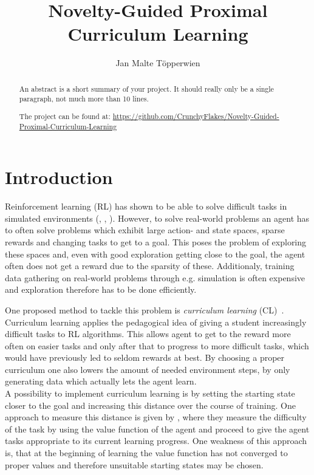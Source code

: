 \documentclass{article}
\title{Novelty-Guided Proximal Curriculum Learning}
\author{Jan Malte Töpperwien}
\begin{document}
\maketitle
\begin{abstract}
    An abstract is a short summary of your project. It should really only be a single paragraph, not much more than 10 lines.

    The project can be found at: \url{https://github.com/CrunchyFlakes/Novelty-Guided-Proximal-Curriculum-Learning}
\end{abstract}
\section{Introduction}
Reinforcement learning (RL) has shown to be able to solve difficult tasks in simulated environments (\citep{human_level_control}, \citep{continuous_control}, \citep{rl_go}). However, to solve real-world problems an agent has to often solve problems which exhibit large action- and state spaces, sparse rewards and changing tasks to get to a goal. This poses the problem of exploring these spaces and, even with good exploration getting close to the goal, the agent often does not get a reward due to the sparsity of these. Additionaly, training data gathering on real-world problems through e.g. simulation is often expensive and exploration therefore has to be done efficiently.

One proposed method to tackle this problem is \textit{curriculum learning} (CL)~\citep{curr}. Curriculum learning applies the pedagogical idea of giving a student increasingly difficult tasks to RL algorithms. This allows agent to get to the reward more often on easier tasks and only after that to progress to more difficult tasks, which would have previously led to seldom rewards at best. By choosing a proper curriculum one also lowers the amount of needed environment steps, by only generating data which actually lets the agent learn. \\
A possibility to implement curriculum learning is by setting the starting state closer to the goal and increasing this distance over the course of training. One approach to measure this distance is given by \cite{prox_curr}, where they measure the difficulty of the task by using the value function of the agent and proceed to give the agent tasks appropriate to its current learning progress. One weakness of this approach is, that at the beginning of learning the value function has not converged to proper values and therefore unsuitable starting states may be chosen.
\end{document}
